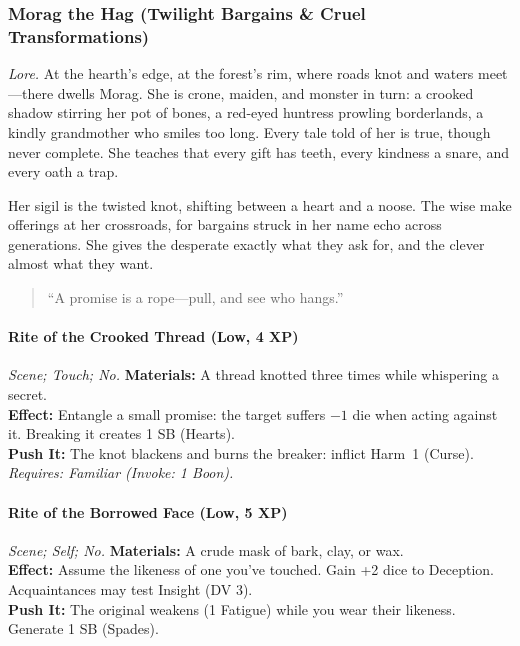 
\subsubsection{Morag the Hag (Twilight Bargains \& Cruel Transformations)}
\textit{Lore.} At the hearth’s edge, at the forest’s rim, where roads knot and waters meet—there dwells Morag. She is crone, maiden, and monster in turn: a crooked shadow stirring her pot of bones, a red-eyed huntress prowling borderlands, a kindly grandmother who smiles too long. Every tale told of her is true, though never complete. She teaches that every gift has teeth, every kindness a snare, and every oath a trap.

Her sigil is the twisted knot, shifting between a heart and a noose. The wise make offerings at her crossroads, for bargains struck in her name echo across generations. She gives the desperate exactly what they ask for, and the clever almost what they want.

\begin{quote}
“A promise is a rope—pull, and see who hangs.”  
\end{quote}

\paragraph*{Rite of the Crooked Thread (Low, 4 XP)}  
\emph{Scene; Touch; No.}  
\textbf{Materials:} A thread knotted three times while whispering a secret. \\  
\textbf{Effect:} Entangle a small promise: the target suffers \(-1\) die when acting against it. Breaking it creates 1 SB (Hearts). \\  
\textbf{Push It:} The knot blackens and burns the breaker: inflict Harm~1 (Curse). \\  
\emph{Requires: Familiar (\textit{Invoke:} 1 Boon).}

\paragraph*{Rite of the Borrowed Face (Low, 5 XP)}  
\emph{Scene; Self; No.}  
\textbf{Materials:} A crude mask of bark, clay, or wax. \\  
\textbf{Effect:} Assume the likeness of one you’ve touched. Gain +2 dice to Deception. Acquaintances may test Insight (DV 3). \\  
\textbf{Push It:} The original weakens (1 Fatigue) while you wear their likeness. Generate 1 SB (Spades). \\  

